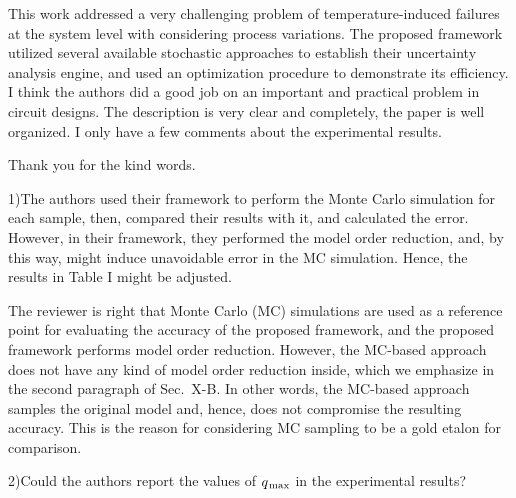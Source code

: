 \begin{reviewer}
This work addressed a very challenging problem of temperature-induced failures
at the system level with considering process variations. The proposed framework
utilized several available stochastic approaches to establish their uncertainty
analysis engine, and used an optimization procedure to demonstrate its
efficiency. I think the authors did a good job on an important and practical
problem in circuit designs. The description is very clear and completely, the
paper is well organized. I only have a few comments about the experimental
results.
\end{reviewer}

\begin{authors}
  Thank you for the kind words.
\end{authors}

\begin{reviewer}
1)The authors used their framework to perform the Monte Carlo
simulation for each sample, then, compared their results with it, and
calculated the error. However, in their framework, they performed the model
order reduction, and, by this way, might induce unavoidable error in the MC
simulation. Hence, the results in Table I might be adjusted.
\end{reviewer}

\begin{authors}
The reviewer is right that Monte Carlo (MC) simulations are used as a reference
point for evaluating the accuracy of the proposed framework, and the proposed
framework performs model order reduction. However, the MC-based approach does
not have any kind of model order reduction inside, which we emphasize in the
second paragraph of Sec.~X-B. In other words, the MC-based approach samples the
original model and, hence, does not compromise the resulting accuracy. This is
the reason for considering MC sampling to be a gold etalon for comparison.

\begin{actions}
\end{actions}
\end{authors}

\begin{reviewer}
2)Could the authors report the values of $q_{\text{\kern0.1emmax}}$ in the
experimental results?
\end{reviewer}

